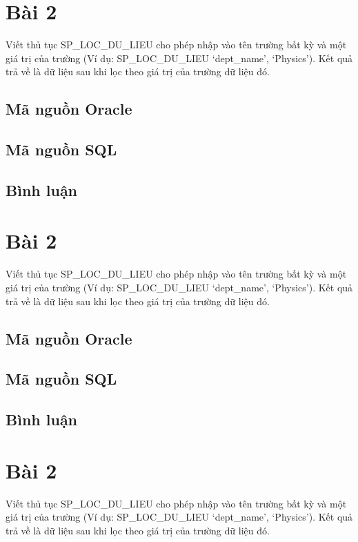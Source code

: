 \documentclass[12pt,a4paper]{report}
\begin{document}
\section{Bài 2}
\begin{boxedminipage}[t]{15.5cm}
	Viết thủ tục SP\_LOC\_DU\_LIEU cho phép nhập vào tên trường bất kỳ và một giá trị của trường (Ví dụ: SP\_LOC\_DU\_LIEU ‘dept\_name’, ‘Physics’). Kết quả trả về là dữ liệu sau khi lọc theo giá trị của trường dữ liệu đó. 	
\end{boxedminipage}

\subsection{Mã nguồn Oracle}

\subsection{Mã nguồn SQL}

\subsection{Bình luận}

\section{Bài 2}
\begin{boxedminipage}[t]{15.5cm}
	Viết thủ tục SP\_LOC\_DU\_LIEU cho phép nhập vào tên trường bất kỳ và một giá trị của trường (Ví dụ: SP\_LOC\_DU\_LIEU ‘dept\_name’, ‘Physics’). Kết quả trả về là dữ liệu sau khi lọc theo giá trị của trường dữ liệu đó. 	
\end{boxedminipage}

\subsection{Mã nguồn Oracle}

\subsection{Mã nguồn SQL}

\subsection{Bình luận}

\section{Bài 2}
\begin{boxedminipage}[t]{15.5cm}
	Viết thủ tục SP\_LOC\_DU\_LIEU cho phép nhập vào tên trường bất kỳ và một giá trị của trường (Ví dụ: SP\_LOC\_DU\_LIEU ‘dept\_name’, ‘Physics’). Kết quả trả về là dữ liệu sau khi lọc theo giá trị của trường dữ liệu đó. 	
\end{boxedminipage}
\end{document}
